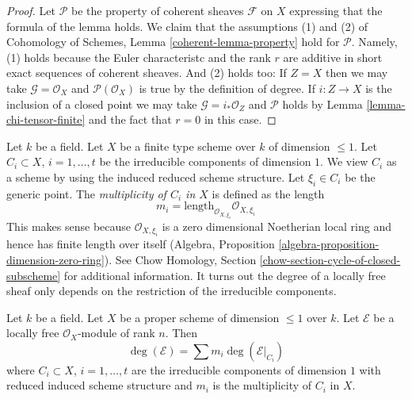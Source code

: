 \begin{proof}
Let $\mathcal{P}$ be the property of coherent sheaves $\mathcal{F}$
on $X$ expressing that the formula of the lemma holds. We claim that
the assumptions (1) and (2) of
Cohomology of Schemes, Lemma \ref{coherent-lemma-property}
hold for $\mathcal{P}$. Namely, (1) holds because the Euler characteristc
and the rank $r$ are additive in short exact sequences of coherent sheaves.
And (2) holds too: If $Z = X$ then we may take
$\mathcal{G} = \mathcal{O}_X$ and $\mathcal{P}(\mathcal{O}_X)$
is true by the definition of degree. If $i : Z \to X$ is the inclusion
of a closed point we may take $\mathcal{G} = i_*\mathcal{O}_Z$
and $\mathcal{P}$ holds by Lemma \ref{lemma-chi-tensor-finite}
and the fact that $r = 0$ in this case.
\end{proof}

\noindent
Let $k$ be a field. Let $X$ be a finite type scheme over $k$ of
dimension $\leq 1$. Let $C_i \subset X$, $i = 1, \ldots, t$ be
the irreducible components of dimension $1$. We view $C_i$ as a scheme
by using the induced reduced scheme structure. Let $\xi_i \in C_i$ be the
generic point. The {\it multiplicity of $C_i$ in $X$} is defined
as the length
$$
m_i = \text{length}_{\mathcal{O}_{X, \xi_i}} \mathcal{O}_{X, \xi_i}
$$
This makes sense because $\mathcal{O}_{X, \xi_i}$ is a zero dimensional
Noetherian local ring and hence has finite length over itself
(Algebra, Proposition \ref{algebra-proposition-dimension-zero-ring}).
See Chow Homology, Section \ref{chow-section-cycle-of-closed-subscheme}
for additional information. It turns out the degree of a locally free
sheaf only depends on the restriction of the irreducible components.

\begin{lemma}
\label{lemma-degree-in-terms-of-components}
Let $k$ be a field. Let $X$ be a proper scheme of dimension $\leq 1$ over $k$.
Let $\mathcal{E}$ be a locally free $\mathcal{O}_X$-module of rank $n$.
Then
$$
\deg(\mathcal{E}) = \sum m_i \deg(\mathcal{E}|_{C_i})
$$
where $C_i \subset X$, $i = 1, \ldots, t$ are the irreducible components
of dimension $1$ with reduced induced scheme structure and $m_i$ is the
multiplicity of $C_i$ in $X$.
\end{lemma}

